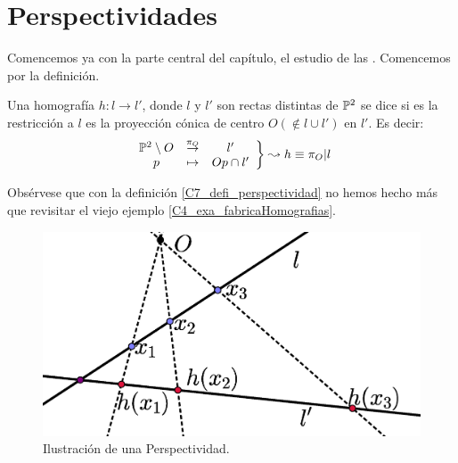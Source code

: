 \section{Perspectividades}
\label{C7_Perspectividades}
Comencemos ya con la parte central del capítulo, el estudio de las . Comencemos por la definición.
\begin{defi}[Perspectividad]
	\label{C7_defi_perspectividad}
	Una homografía $h:l\to l'$, donde $l$ y $l'$ son rectas distintas de $\mathbb{P}^2$ se dice  si es la restricción a $l$ es la proyección cónica de centro $O(\not\in l\cup l')$ en $l'$. Es decir:
	\[\left.\begin{array}{ccc}\mathbb{P}^2\setminus{O}&\stackrel{\pi_O}{\to}&l'\\p& \mapsto & Op\cap l'\end{array}\right\}\leadsto h\equiv \pi_O|l\]
\end{defi}
Obsérvese que con la definición \ref{C7_defi_perspectividad} no hemos hecho más que revisitar el viejo ejemplo \ref{C4_exa_fabricaHomografias}.
\begin{figure}[h]
	\centering
	\includegraphics[scale=.3]{Graficos/perspectividad.eps}
	\caption{Ilustración de una Perspectividad.}
	\label{C7_img_perspectividad}
\end{figure}

